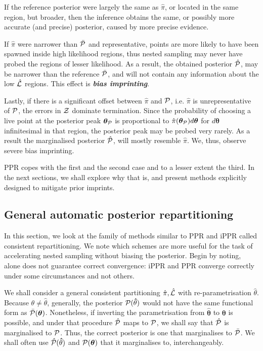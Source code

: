 \documentclass[usenatbib]{mnras}
\begin{document}
If the reference posterior were largely the same as $\hat{\pi}$, or
located in the same region, but broader, then the inference obtains
the same, or possibly more accurate (and precise) posterior, caused by
more precise evidence.

If $\hat{\pi}$ were narrower than $\bar{\cal P}$ and representative,
points are more likely to have been spawned inside high likelihood
regions, thus nested sampling may never have probed the regions of
lesser likelihood. As a result, the obtained posterior $\hat{\cal P}$,
may be narrower than the reference $\bar{\cal P}$, and will not
contain any information about the low $\hat{\cal L}$ regions. This
effect is \textbf{\emph{bias imprinting}}.

Lastly, if there is a significant offset between $\hat{\pi}$ and
${\cal P}$, i.e. $\hat{\pi}$ is unrepresentative of ${\cal P}$, the
errors in ${\cal Z}$ dominate termination. Since the probability of
choosing a live point at the posterior peak \(\bm{\theta}_{{\cal P}}\)
is proportional to $\hat{\pi}(\bm{\theta}_{{\cal P}})d\bm{\theta}$ for
\(d\bm{\theta}\) infinitesimal in that region, the posterior peak may
be probed very rarely. As a result the marginalised posterior
$\hat{\cal P}$, will mostly resemble $\hat{\pi}$. We, thus, observe
severe bias imprinting.

PPR copes with the first and the second case and to a lesser extent
the third. In the next sections, we shall explore why that is, and
present methods explicitly designed to mitigate prior imprints.
\subsection{General automatic posterior repartitioning}\label{sec:gapr}

In this section, we look at the family of methods similar to PPR and
iPPR called consistent repartitioning. We note which schemes are more
useful for the task of accelerating nested sampling without biasing
the posterior. Begin by noting,  alone does not
guarantee correct convergence: iPPR and PPR converge correctly under
some circumstances and not others.

We shall consider a general consistent partitioning
\(\hat{\pi}, \hat{\cal L}\) with re-parametrisation
\(\hat{\theta}\). Because $\theta \ne \hat{\theta}$, generally, the
posterior \({\cal P}(\bm\hat{\theta})\) would not have the same
functional form as \(\bar{\cal P}(\bm{\theta})\). Nonetheless, if
inverting the parametrisation from $\bm{\hat{\theta}}$ to $\bm{\theta}$
is possible, and under that procedure $\hat{\cal P}$ maps to
${\cal P}$, we shall say that $\hat{\cal P}$ is marginalised to
${\cal P}$. Thus, the correct posterior is one that marginalises to
$\bar{\cal P}$. We shall often use $\hat{\cal P}(\bm\hat{\theta})$ and
${\cal P}(\bm{\theta})$ that it marginalises to, interchangeably.
\end{document}
